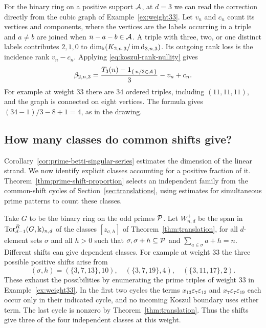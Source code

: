 For the binary ring on a positive support $\mathcal A$, at $d=3$ we can read
the correction directly from the cubic graph of
Example~\ref{ex:weight33}. Let $v_n$ and $c_n$ count its vertices and
components, where the vertices are the labels occurring in a triple
and $a\ne b$ are joined when $n-a-b\in\mathcal A$. A triple with three, two,
or one distinct labels contributes $2,1,0$ to
$\dim_\Bbbk(K_{2,n,3}/\operatorname{im}\mathrm{d}_{3,n,3})$. Its outgoing
rank loss is the incidence rank $v_n-c_n$. Applying
\eqref{eq:koszul-rank-nullity} gives
\begin{equation}\label{eq:cubic-betti-euler}
 \beta_{2,n,3}
  =\frac{T_3(n)-\mathbf1_{\{\,n/3\in\mathcal A\,\}}}{3}-v_n+c_n.
\end{equation}
For example at weight $33$ there are $34$ ordered triples, including
$(11,11,11)$, and the graph is connected on eight vertices. The formula
gives $(34-1)/3-8+1=4$, as in the drawing.

\subsection{How many classes do common shifts give?}
Corollary~\ref{cor:prime-betti-singular-series} estimates the dimension
of the linear strand. We now identify explicit classes accounting for
a positive fraction of it. Theorem~\ref{thm:prime-shift-proportion}
selects an independent family from the common-shift cycles of
Section~\ref{sec:translations}, using estimates for simultaneous prime
patterns to count these classes.

Take $G$ to be the binary ring on the odd primes $\mathcal P$. Let
$W^+_{n,d}$ be the span in $\operatorname{Tor}^R_{d-1}(G,\Bbbk)_{n,d}$ of the classes
$[z_{\sigma,h}]$ of Theorem~\ref{thm:translation}, for all $d$-element sets
$\sigma$ and all $h>0$ such that $\sigma,\sigma+h\subseteq\mathcal P$ and
$\sum_{a\in \sigma}a+h=n$. Different shifts can give dependent classes.
For example at weight $33$ the three possible positive shifts arise from
\[
 (\sigma,h)=(\{3,7,13\},10),\quad(\{3,7,19\},4),\quad(\{3,11,17\},2).
\]
These exhaust the possibilities by enumerating the prime triples of
weight $33$ in Example~\ref{ex:weight33}. In the first two cycles the
terms $x_{13}\varepsilon_7\varepsilon_{13}$ and
$x_7\varepsilon_7\varepsilon_{19}$ each occur only in their indicated
cycle, and no incoming Koszul boundary uses either term. The last
cycle is nonzero by Theorem~\ref{thm:translation}. Thus the shifts give
three of the four independent classes at this weight.

